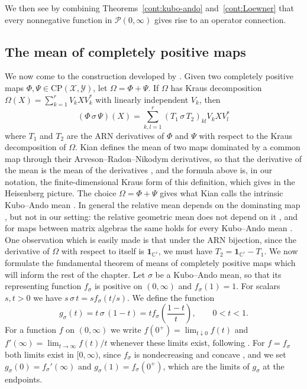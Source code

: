 We then see by combining Theorems~\ref{cont:kubo-ando} and~\ref{cont:Loewner} that every nonnegative function in $\mathcal{P}(0,\infty)$ gives rise to an operator connection.
 
\subsection{The mean of completely positive maps}
 
We now come to the construction developed by \cite{kian2026relative}. Given two completely positive maps $\Phi,\Psi\in \mathrm{CP}(\mathcal{X},\mathcal{Y})$, let $\Omega=\Phi+\Psi$. If $\Omega$ has Kraus decomposition 
$\Omega(X)=\sum_{k=1}^rV_kXV_k^*$ with linearly independent $V_k$, then \[(\Phi\,\sigma\,\Psi)(X)=\sum_{k,l=1}^r(T_1\,\sigma\,T_2)_{kl}V_kXV_l^*\]
where $T_1$ and $T_2$ are the ARN derivatives of $\Phi$ and $\Psi$ with respect to the Kraus decomposition of $\Omega$. Kian defines the mean of two maps dominated by a common map through their Arveson--Radon--Nikodym derivatives, so that the derivative of the mean is the mean of the derivatives \cite[Proposition~3.5]{kian2026relative}, and the formula above is, in our notation, the finite-dimensional Kraus form of this definition, which \cite[Proposition~3.13]{kian2026relative} gives in the Heisenberg picture. The choice $\Omega=\Phi+\Psi$ gives what Kian calls the intrinsic Kubo--Ando mean \cite[Remark~3.3]{kian2026relative}. In general the relative mean depends on the dominating map \cite[Remark~3.3]{kian2026relative}, but not in our setting: the relative geometric mean does not depend on it \cite[Remark~4.2]{kian2026relative}, and for maps between matrix algebras the same holds for every Kubo--Ando mean \cite[Theorem~5.1]{kian2026relative}. One observation which is easily made is that under the ARN bijection, since the derivative of $\Omega$ with respect to itself is $\mathbf{1}_{\mathbb{C}^r}$, we must have $T_2=\mathbf{1}_{\mathbb{C}^r}-T_1$. We now formulate the fundamental theorem of means of completely positive maps which will inform the rest of the chapter.
Let $\sigma$ be a Kubo--Ando mean, so that its representing function $f_\sigma$ is positive on $(0,\infty)$ and $f_\sigma(1)=1$. For scalars $s,t>0$ we have $s\,\sigma\,t=sf_\sigma(t/s)$. We define the function
\[
    g_\sigma(t)=t\,\sigma\,(1-t)=tf_\sigma\left(\frac{1-t}{t}\right),\qquad 0<t<1.
\]
For a function $f$ on $(0,\infty)$ we write $f(0^+)=\lim_{t\downarrow0}f(t)$ and $f'(\infty)=\lim_{t\to\infty}f(t)/t$ whenever these limits exist, following \cite{Okayasu2026maxf}. For $f=f_\sigma$ both limits exist in $[0,\infty)$, since $f_\sigma$ is nondecreasing and concave \cite[Theorem~V.2.5]{bhatia1997matrix}, and we set $g_\sigma(0)=f_\sigma'(\infty)$ and $g_\sigma(1)=f_\sigma(0^+)$, which are the limits of $g_\sigma$ at the endpoints. 
